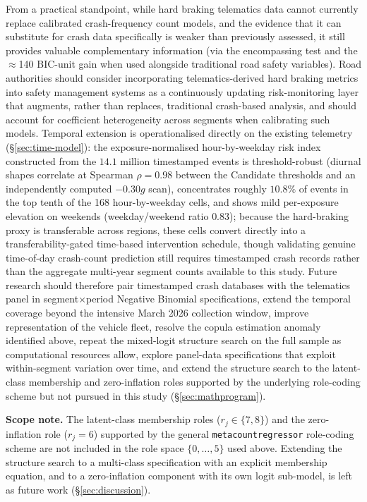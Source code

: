 \documentclass[letterpaper,8pt]{extarticle}  %
\begin{document}
\begin{doublespacing}
\begin{linenumbers}
From a practical standpoint, while hard braking telematics data cannot currently replace calibrated crash-frequency count models, and the evidence that it can substitute for crash data specifically is weaker than previously assessed, it still provides valuable complementary information (via the encompassing test and the $\approx$140 BIC-unit gain when used alongside traditional road safety variables). Road authorities should consider incorporating telematics-derived hard braking metrics into safety management systems as a continuously updating risk-monitoring layer that augments, rather than replaces, traditional crash-based analysis, and should account for coefficient heterogeneity across segments when calibrating such models. Temporal extension is operationalised directly on the existing telemetry (\S\ref{sec:time-model}): the exposure-normalised hour-by-weekday risk index constructed from the $14.1$ million timestamped events is threshold-robust (diurnal shapes correlate at Spearman $\rho=0.98$ between the Candidate thresholds and an independently computed $-0.30g$ scan), concentrates roughly $10.8\%$ of events in the top tenth of the 168 hour-by-weekday cells, and shows mild per-exposure elevation on weekends (weekday/weekend ratio $0.83$); because the hard-braking proxy is transferable across regions, these cells convert directly into a transferability-gated time-based intervention schedule, though validating genuine time-of-day crash-count prediction still requires timestamped crash records rather than the aggregate multi-year segment counts available to this study. Future research should therefore pair timestamped crash databases with the telematics panel in segment$\times$period Negative Binomial specifications, extend the temporal coverage beyond the intensive March 2026 collection window, improve representation of the vehicle fleet, resolve the copula estimation anomaly identified above, repeat the mixed-logit structure search on the full sample as computational resources allow, explore panel-data specifications that exploit within-segment variation over time, and extend the structure search to the latent-class membership and zero-inflation roles supported by the underlying role-coding scheme but not pursued in this study (\S\ref{sec:mathprogram}).

\textbf{Scope note.} The latent-class membership roles ($r_j \in \{7,8\}$) and the zero-inflation role ($r_j = 6$) supported by the general \texttt{metacount\allowbreak regressor} role-coding scheme are not included in the role space $\{0,\dots,5\}$ used above. Extending the structure search to a multi-class specification with an explicit membership equation, and to a zero-inflation component with its own logit sub-model, is left as future work (\S\ref{sec:discussion}).
\end{linenumbers}
\end{doublespacing}
\end{document}
